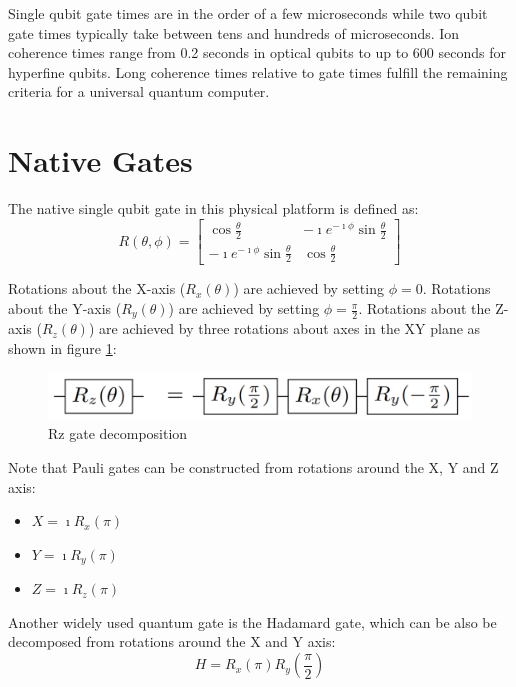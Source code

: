 Single qubit gate times are in the order of a few microseconds while two qubit gate times typically take between tens and hundreds of microseconds. Ion coherence times range from 0.2 seconds in optical qubits to up to 600 seconds for hyperfine qubits. Long coherence times relative to gate times fulfill the remaining criteria for a universal quantum computer.

\section{Native Gates}

The native single qubit gate\cite{3QubitGroverSearch_2017} in this physical platform is defined as:
$$R(\theta,\phi)=\left[\begin{array}{cc}\cos{\frac{\theta}{2}} & -\imath e^{-\imath \phi}\sin{\frac{\theta}{2}} \\ -\imath e^{-\imath \phi}\sin{\frac{\theta}{2}} & \cos{\frac{\theta}{2}}\end{array}\right]$$

Rotations about the X-axis ($R_x(\theta)$) are achieved by setting $\phi=0$. Rotations about the Y-axis ($R_y(\theta)$) are achieved by setting $\phi=\frac{\pi}{2}$. Rotations about the Z-axis ($R_z(\theta)$) are achieved by three rotations about axes in the XY plane as shown in figure \ref{fig:RzGate}:

\begin{figure}[h!]
    \centering
    \includegraphics[scale=.35]{images/TrappedIons-RzGate.png}
    \caption{Rz gate \cite{3QubitGroverSearch_2017} decomposition}
    \label{fig:RzGate}
\end{figure}

Note that Pauli gates can be constructed from rotations around the X, Y and Z axis:
\begin{itemize}[noitemsep,nolistsep]
    \item $X=\imath R_x(\pi)$
    \item $Y=\imath R_y(\pi)$
    \item $Z=\imath R_z(\pi)$
\end{itemize}

Another widely used quantum gate is the Hadamard gate, which can be also be decomposed from rotations around the X and Y axis\cite{QuantumInspire_HadamardGate}:
$$H=R_x(\pi)R_y(\frac{\pi}{2})$$

